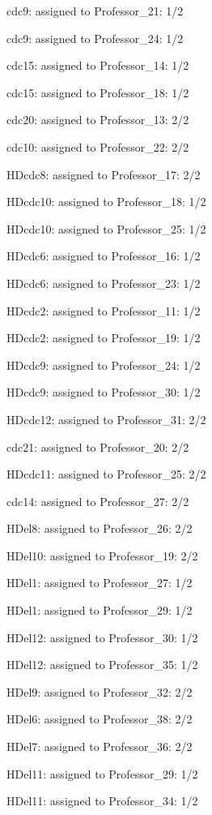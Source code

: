 \documentclass{article} %
\begin{document}
\noindent cdc9: assigned to Professor\_21: 1/2

\noindent cdc9: assigned to Professor\_24: 1/2

\noindent cdc15: assigned to Professor\_14: 1/2

\noindent cdc15: assigned to Professor\_18: 1/2

\noindent cdc20: assigned to Professor\_13: 2/2

\noindent cdc10: assigned to Professor\_22: 2/2

\noindent HDcdc8: assigned to Professor\_17: 2/2

\noindent HDcdc10: assigned to Professor\_18: 1/2

\noindent HDcdc10: assigned to Professor\_25: 1/2

\noindent HDcdc6: assigned to Professor\_16: 1/2

\noindent HDcdc6: assigned to Professor\_23: 1/2

\noindent HDcdc2: assigned to Professor\_11: 1/2

\noindent HDcdc2: assigned to Professor\_19: 1/2

\noindent HDcdc9: assigned to Professor\_24: 1/2

\noindent HDcdc9: assigned to Professor\_30: 1/2

\noindent HDcdc12: assigned to Professor\_31: 2/2

\noindent cdc21: assigned to Professor\_20: 2/2

\noindent HDcdc11: assigned to Professor\_25: 2/2

\noindent cdc14: assigned to Professor\_27: 2/2

\noindent HDel8: assigned to Professor\_26: 2/2

\noindent HDel10: assigned to Professor\_19: 2/2

\noindent HDel1: assigned to Professor\_27: 1/2

\noindent HDel1: assigned to Professor\_29: 1/2

\noindent HDel12: assigned to Professor\_30: 1/2

\noindent HDel12: assigned to Professor\_35: 1/2

\noindent HDel9: assigned to Professor\_32: 2/2

\noindent HDel6: assigned to Professor\_38: 2/2

\noindent HDel7: assigned to Professor\_36: 2/2

\noindent HDel11: assigned to Professor\_29: 1/2

\noindent HDel11: assigned to Professor\_34: 1/2
\end{document}
